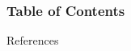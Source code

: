 \documentclass{beamer}
\begin{document}
\frame{\titlepage}

\begin{frame}
    \frametitle{Table of Contents}
    \tableofcontents
\end{frame}






\begin{frame}[allowframebreaks]{References}
	\raggedright
	\scriptsize
	\printbibliography
\end{frame}
\end{document}
